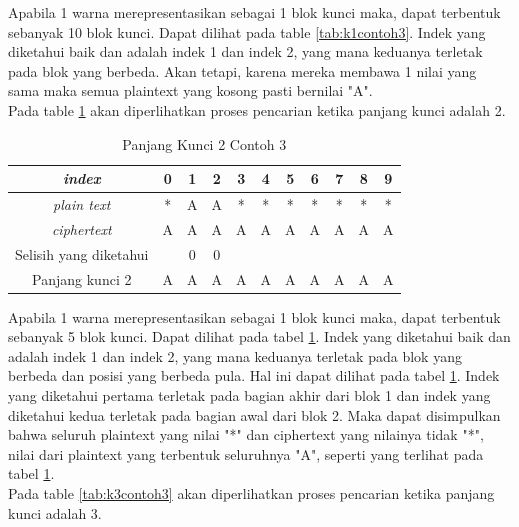 	Apabila 1 warna merepresentasikan sebagai 1 blok kunci maka, dapat terbentuk sebanyak 10 blok kunci. Dapat dilihat pada table \ref{tab:k1contoh3}. Indek yang diketahui baik \plaintext dan \ciphertext adalah indek 1 dan indek 2, yang mana keduanya terletak pada blok yang berbeda. Akan tetapi, karena mereka membawa 1 nilai yang sama maka semua plaintext yang kosong pasti bernilai "A".
	\\
	Pada table \ref{tab:k2contoh3} akan diperlihatkan proses pencarian ketika panjang kunci adalah 2.
	\begin{table}[H]
	 	\centering
	 	\setlength{\arrayrulewidth}{.08em}
	 	\begin{tabular}{|c|c|c|c|c|c|c|c|c|c|c|}\hline
	 	\textit{index}&0&1&2&3&4&5&6&7&8&9\\ \hline
	 	\textit{plain text}&\cellcolor{blue!15}*&\cellcolor{blue!15}A&\cellcolor{green!15}A&\cellcolor{green!15}*&\cellcolor{pink!30}*&\cellcolor{pink!30}*&\cellcolor{violet!30}*&\cellcolor{violet!30}*&\cellcolor{purple!25}*&\cellcolor{purple!25}*\\ \hline
	 	\textit{ciphertext}&\cellcolor{blue!15}A&\cellcolor{blue!15}A&\cellcolor{green!15}A&\cellcolor{green!15}A&\cellcolor{pink!30}A&\cellcolor{pink!30}A&\cellcolor{violet!30}A&\cellcolor{violet!30}A&\cellcolor{purple!25}A&\cellcolor{purple!25}A\\ \hline
		Selisih yang diketahui & &0&0& & & & & & & \\ \hline	
		Panjang kunci 2 &A&A&A&A&A&A&A&A&A&A\\ \hline 	
	 	\end{tabular}
	 	\caption{Panjang Kunci 2 Contoh 3}
	 	\label{tab:k2contoh3}
	\end{table}
	Apabila 1 warna merepresentasikan sebagai 1 blok kunci maka, dapat terbentuk sebanyak 5 blok kunci. Dapat dilihat pada tabel \ref{tab:k2contoh3}. Indek yang diketahui baik \plaintext dan \ciphertext adalah indek 1 dan indek 2, yang mana keduanya terletak pada blok yang berbeda dan posisi yang berbeda pula. Hal ini dapat dilihat pada tabel \ref{tab:k2contoh3}. Indek yang diketahui pertama terletak pada bagian akhir dari blok 1 dan indek yang diketahui kedua terletak pada bagian awal dari blok 2. Maka dapat disimpulkan bahwa seluruh plaintext yang nilai "*" dan ciphertext yang nilainya tidak "*", nilai dari plaintext yang terbentuk seluruhnya "A", seperti yang terlihat pada tabel \ref{tab:k2contoh3}.
	\\	
	Pada table \ref{tab:k3contoh3} akan diperlihatkan proses pencarian ketika panjang kunci adalah 3.
